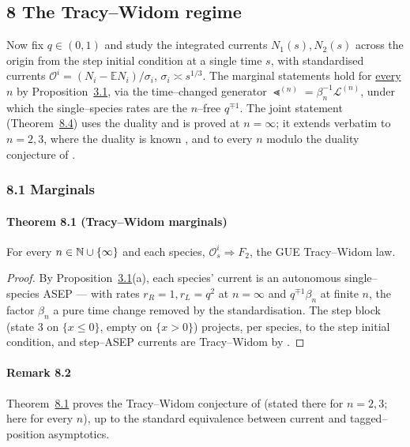 \documentclass[11pt]{article}
\theoremstyle{plain}
\theoremstyle{definition}
\theoremstyle{remark}
\newcommand{\E}{\mathbb{E}}\newcommand{\PP}{\mathbb{P}}\newcommand{\dd}{\,\mathrm{d}}
\newcommand{\To}{\Rightarrow}\newcommand{\so}{\mathfrak{so}}
\newcommand{\cL}{\mathcal L}\newcommand{\cO}{\mathcal O}\newcommand{\cE}{\mathcal E}
\begin{document}
\subsection{8 The Tracy--Widom regime}\label{sec_tw}

Now fix $q\in(0,1)$ and study the integrated currents $N_1(s),N_2(s)$ across the origin
from the step initial condition at a single time $s$, with standardised currents
$\cO^i=(N_i-\E N_i)/\sigma_i$, $\sigma_i\asymp s^{1/3}$. The marginal statements hold
for \underline{every} $n$ by Proposition~\hyperref[prop_decouple]{3.1}, via the time--changed
generator $\Lt^{(n)}=\beta_n^{-1}\cL^{(n)}$, under which the single--species rates
are the $n$--free $q^{\mp1}$. The joint statement (Theorem~\hyperref[thm_cov]{8.4}) uses the
duality and is proved at $n=\infty$; it extends verbatim to $n=2,3$, where the
duality is known \cite{REU}, and to every $n$ modulo the duality conjecture of
\cite[Rmk.~4]{REU}.

\subsubsection{8.1 Marginals}
\paragraph{Theorem 8.1 (Tracy--Widom marginals)}\label{thm_marg}

For every $n\in\mathbb{N}\cup\{\infty\}$ and each species, $\cO^i_s\To F_2$, the GUE
Tracy--Widom law.
\par
\begin{proof}
By Proposition~\hyperref[prop_decouple]{3.1}(a), each species' current
is an autonomous single--species ASEP --- with rates $r_R=1,r_L=q^2$ at $n=\infty$ and
$q^{\mp1}\beta_n$ at finite $n$, the factor $\beta_n$ a pure time change removed by
the standardisation. The step block (state $3$ on $\{x\le0\}$, empty on $\{x>0\}$)
projects, per species, to the step initial condition, and step--ASEP currents are
Tracy--Widom by \cite[Thm.~1.4]{BCS}.
\end{proof}

\paragraph{Remark 8.2}

Theorem~\hyperref[thm_marg]{8.1} proves the Tracy--Widom conjecture of \cite[\S3.1.1]{REU}
(stated there for $n=2,3$; here for every $n$), up to the standard equivalence
between current and tagged--position asymptotics.
\par
\end{document}
